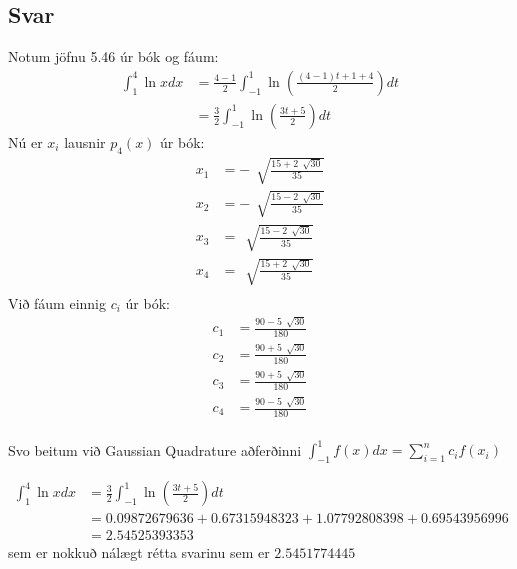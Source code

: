 \documentclass[11pt]{article}
\begin{document}
\subsection*{Svar}
Notum jöfnu 5.46 úr bók og fáum:
\begin{align*}
\int_1^4\ln x dx 	&= \frac{4-1}{2}\int_{-1}^1\ln(\frac{(4-1)t+1+4}{2})dt\\
					&=\frac 32 \int_{-1}^1\ln (\frac{3t+5}{2}) dt 
\end{align*}
Nú er $x_i$ lausnir $p_4(x)$ úr bók:
\begin{align*}
x_1 &= -\, \sqrt[]{\frac{15+2\,\sqrt[]{30}}{35}}\\
x_2 &= -\, \sqrt[]{\frac{15-2\,\sqrt[]{30}}{35}}\\
x_3 &=\, \sqrt[]{\frac{15-2\,\sqrt[]{30}}{35}}\\
x_4 &= \, \sqrt[]{\frac{15+2\,\sqrt[]{30}}{35}}\\
\end{align*}
Við fáum einnig $c_i$ úr bók:
\begin{align*}
c_1 &=\frac{90-5\, \sqrt[]{30}}{180}\\
c_2 &=\frac{90+5\, \sqrt[]{30}}{180}\\
c_3 &=\frac{90+5\, \sqrt[]{30}}{180}\\
c_4 &=\frac{90-5\, \sqrt[]{30}}{180}\\
\end{align*}

Svo beitum við Gaussian Quadrature aðferðinni $\int_{-1}^1 f(x) dx = \sum_{i=1}^n c_i f(x_i) $

\begin{align*}
\int_1^4 \ln x dx 	&= \frac 32 \int_{-1}^1 \ln (\frac{3t+5}{2})dt\\
					&=0.09872679636+0.67315948323+1.07792808398+0.69543956996\\
                    &= 2.54525393353
\end{align*}
sem er nokkuð nálægt rétta svarinu sem er $2.5451774445$
\end{document}
